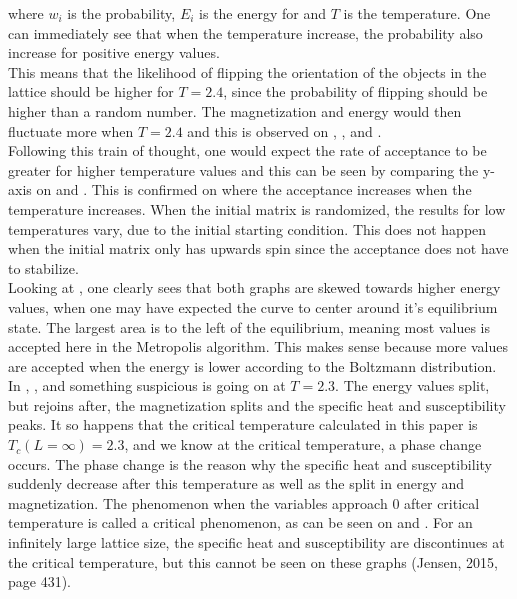 \documentclass[10pt,a4paper]{article}
\begin{document}
\noindent where $w_i$ is the probability, $E_i$ is the energy for and $T$ is the temperature. One can immediately see that when the temperature increase, the probability also increase for positive energy values.
\\
This means that the likelihood of flipping the orientation of the objects in the lattice should be higher for $T = 2.4$, since the probability of flipping should be higher than a random number. The magnetization and energy would then fluctuate more when $T = 2.4$ and this is observed on ,  ,  and .
\\
Following this train of thought, one would expect the rate of acceptance to be greater for higher temperature values and this can be seen by comparing the y-axis on  and . This is confirmed on  where the acceptance increases when the temperature increases. When the initial matrix is randomized, the results for low temperatures vary, due to the initial starting condition. This does not happen when the initial matrix only has upwards spin since the acceptance does not have to stabilize.
\\
Looking at , one clearly sees that both graphs are skewed towards higher energy values, when one may have expected the curve to center around it's equilibrium state. The largest area is to the left of the equilibrium, meaning most values is accepted here in the Metropolis algorithm. This makes sense because more values are accepted when the energy is lower according to the Boltzmann distribution.
\\
In , ,  and  something suspicious is going on at $T = 2.3$. The energy values split, but rejoins after, the magnetization splits and the specific heat and susceptibility peaks. It so happens that the critical temperature calculated in this paper is $T_c(L = \infty) = 2.3$, and we know at the critical temperature, a phase change occurs. The phase change is the reason why the specific heat and susceptibility suddenly decrease after this temperature as well as the split in energy and magnetization. The phenomenon when the variables approach $0$ after critical temperature is called a critical phenomenon, as can be seen on  and . For an infinitely large lattice size, the specific heat and susceptibility are discontinues at the critical temperature, but this cannot be seen on these graphs (Jensen, 2015, page 431).
\end{document}
